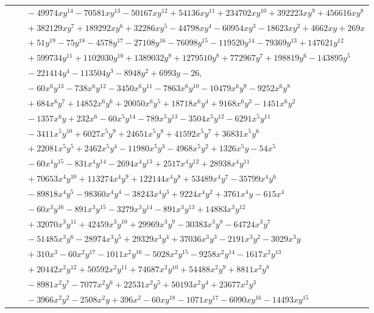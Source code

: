 \documentclass[11pt]{article}
\begin{document}
\begin{longtable}{@{}ll@{}}
 & $\quad -49974xy^{14}-70581xy^{13}-50167xy^{12}+54136xy^{11}+234702xy^{10}+392223xy^{9}+456616xy^{8}$\\
 & $\quad +382129xy^{7}+189292xy^{6}+32286xy^{5}-44798xy^{4}-60954xy^{3}-18623xy^{2}+4662xy+269x$\\
 & $\quad +51y^{19}-75y^{18}-4578y^{17}-27108y^{16}-76098y^{15}-119520y^{14}-79369y^{13}+147621y^{12}$\\
 & $\quad +599734y^{11}+1102030y^{10}+1389032y^{9}+1279510y^{8}+772967y^{7}+198819y^{6}-143895y^{5}$\\
 & $\quad -221414y^{4}-113504y^{3}-8948y^{2}+6993y-26,$\\
 & $\quad -60x^{6}y^{13}-738x^{6}y^{12}-3450x^{6}y^{11}-7863x^{6}y^{10}-10479x^{6}y^{9}-9252x^{6}y^{8}$\\
 & $\quad +684x^{6}y^{7}+14852x^{6}y^{6}+20050x^{6}y^{5}+18718x^{6}y^{4}+9168x^{6}y^{3}-1451x^{6}y^{2}$\\
 & $\quad -1357x^{6}y+232x^{6}-60x^{5}y^{14}-789x^{5}y^{13}-3504x^{5}y^{12}-6291x^{5}y^{11}$\\
 & $\quad -3411x^{5}y^{10}+6027x^{5}y^{9}+24651x^{5}y^{8}+41592x^{5}y^{7}+36831x^{5}y^{6}$\\
 & $\quad +22081x^{5}y^{5}+2462x^{5}y^{4}-11980x^{5}y^{3}-4968x^{5}y^{2}+1326x^{5}y-54x^{5}$\\
 & $\quad -60x^{4}y^{15}-831x^{4}y^{14}-2694x^{4}y^{13}+2517x^{4}y^{12}+28938x^{4}y^{11}$\\
 & $\quad +70653x^{4}y^{10}+113274x^{4}y^{9}+122144x^{4}y^{8}+53489x^{4}y^{7}-35799x^{4}y^{6}$\\
 & $\quad -89818x^{4}y^{5}-98360x^{4}y^{4}-38243x^{4}y^{3}+9224x^{4}y^{2}+3761x^{4}y-615x^{4}$\\
 & $\quad -60x^{3}y^{16}-891x^{3}y^{15}-3279x^{3}y^{14}-891x^{3}y^{13}+14883x^{3}y^{12}$\\
 & $\quad +32070x^{3}y^{11}+42459x^{3}y^{10}+29969x^{3}y^{9}-30383x^{3}y^{8}-64724x^{3}y^{7}$\\
 & $\quad -51485x^{3}y^{6}-28974x^{3}y^{5}+29329x^{3}y^{4}+37036x^{3}y^{3}-2191x^{3}y^{2}-3029x^{3}y$\\
 & $\quad +310x^{3}-60x^{2}y^{17}-1011x^{2}y^{16}-5028x^{2}y^{15}-9258x^{2}y^{14}-1617x^{2}y^{13}$\\
 & $\quad +20442x^{2}y^{12}+50592x^{2}y^{11}+74687x^{2}y^{10}+54488x^{2}y^{9}+8811x^{2}y^{8}$\\
 & $\quad -8981x^{2}y^{7}-7077x^{2}y^{6}+22531x^{2}y^{5}+50193x^{2}y^{4}+23677x^{2}y^{3}$\\
 & $\quad -3966x^{2}y^{2}-2508x^{2}y+396x^{2}-60xy^{18}-1071xy^{17}-6090xy^{16}-14493xy^{15}$\\

\end{longtable}
\end{document}
